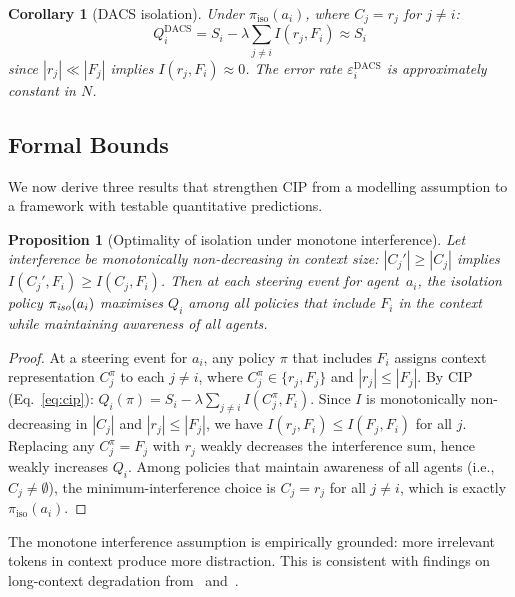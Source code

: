 \documentclass{article}
\newtheorem{proposition}{Proposition}
\newtheorem{corollary}{Corollary}
\begin{document}
\begin{corollary}[DACS isolation]
\label{cor:dacs}
Under $\pi_{\text{iso}}(a_i)$, where $C_j = r_j$ for $j \neq i$:
\begin{equation}
  Q_i^{\text{DACS}} = S_i - \lambda \sum_{j \neq i} I(r_j, F_i)
  \approx S_i
  \label{eq:dacs_quality}
\end{equation}
since $|r_j| \ll |F_j|$ implies $I(r_j, F_i) \approx 0$.
The error rate $\varepsilon_i^{\text{DACS}}$ is approximately constant
in $N$.
\end{corollary}

\subsection{Formal Bounds}
\label{sec:bounds}

We now derive three results that strengthen CIP from a modelling
assumption to a framework with testable quantitative predictions.

\begin{proposition}[Optimality of isolation under monotone interference]
\label{prop:optimal}
Let interference be monotonically non-decreasing in context size:
$|C_j'| \geq |C_j|$ implies $I(C_j', F_i) \geq I(C_j, F_i)$.
Then at each steering event for agent~$a_i$, the isolation policy
$\pi_{\emph{iso}}(a_i)$ maximises $Q_i$ among all policies that
include $F_i$ in the context while maintaining awareness of all agents.
\end{proposition}

\begin{proof}
At a steering event for $a_i$, any policy $\pi$ that includes $F_i$
assigns context representation $C_j^\pi$ to each $j \neq i$, where
$C_j^\pi \in \{r_j, F_j\}$ and $|r_j| \leq |F_j|$.
By CIP (Eq.~\ref{eq:cip}):
$Q_i(\pi) = S_i - \lambda \sum_{j \neq i} I(C_j^\pi, F_i)$.
Since $I$ is monotonically non-decreasing in $|C_j|$ and
$|r_j| \leq |F_j|$, we have
$I(r_j, F_i) \leq I(F_j, F_i)$ for all $j$.
Replacing any $C_j^\pi = F_j$ with $r_j$ weakly decreases the
interference sum, hence weakly increases $Q_i$.
Among policies that maintain awareness of all agents
(i.e., $C_j \neq \emptyset$), the minimum-interference choice is
$C_j = r_j$ for all $j \neq i$, which is exactly
$\pi_{\text{iso}}(a_i)$.
\end{proof}

\noindent The monotone interference assumption is empirically
grounded: more irrelevant tokens in context produce more distraction.
This is consistent with findings on long-context degradation
from~\citet{afm2024} and~\citet{adaptorch2025}.
\end{document}
